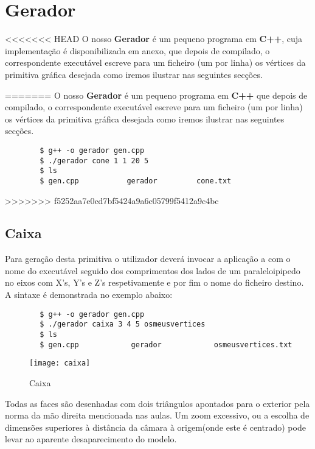 \documentclass{article}
\begin{document}
\newpage

\section{Gerador}
<<<<<<< HEAD
O nosso \textbf{Gerador} é um pequeno programa em \textbf{C++}, cuja implementação é disponibilizada em anexo, que depois de compilado, o correspondente executável escreve para um ficheiro (um por linha) os vértices da primitiva gráfica desejada  como iremos ilustrar nas seguintes secções.


=======
O nosso \textbf{Gerador} é um pequeno programa em \textbf{C++} que depois de compilado, o correspondente executável escreve para um ficheiro (um por linha) os vértices da primitiva gráfica desejada  como iremos ilustrar nas seguintes secções.
\begin{commandline}
	\begin{verbatim}
		$ g++ -o gerador gen.cpp
		$ ./gerador cone 1 1 20 5
		$ ls
		$ gen.cpp			gerador			cone.txt
	\end{verbatim}
\end{commandline}
>>>>>>> f5252aa7e0cd7bf5424a9a6c05799f5412a9c4bc
\subsection{Caixa}
Para geração desta primitiva o utilizador deverá invocar a aplicação a com o nome do executável seguido dos comprimentos dos lados de um paraleloipipedo no eixos com X’s, Y’s e Z’s respetivamente e por fim o nome do ficheiro destino. A sintaxe é demonstrada no exemplo abaixo:

\begin{commandline}
    \begin{verbatim}
        $ g++ -o gerador gen.cpp
        $ ./gerador caixa 3 4 5 osmeusvertices
        $ ls
        $ gen.cpp            gerador            osmeusvertices.txt
    \end{verbatim}
\end{commandline}

\begin{figure}[H]
	\centering
	\texttt{[image: caixa]}
	\caption{Caixa}
\end{figure}

\begin{warn}[Notice:]
Todas as faces são desenhadas com dois triângulos apontados para o exterior pela norma da mão direita mencionada nas aulas. Um zoom excessivo, ou a escolha de dimensões superiores à distância da câmara à origem(onde este é centrado)  pode levar ao aparente desaparecimento do modelo.
\end{warn}
\end{document}
